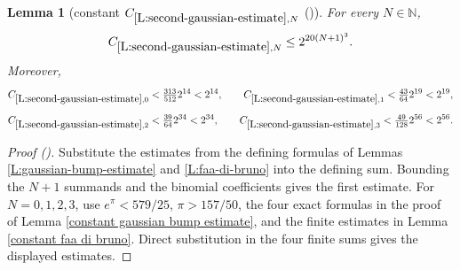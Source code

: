 \documentclass[12pt,reqno]{amsart}
\newcommand{\auto}{{({\tiny\faCar})}}
\theoremstyle{plain}
\newtheorem{lemma}[theorem]{Lemma}
\numberwithin{equation}{section}
\theoremstyle{remark}
\newcommand{\using}[1]{}
\newcommand{\N}{{\mathbb N}}
\newcommand{\ls}[1]{{\color{red}{[L: #1]}}}
\newcommand{\ct}[1]{{\color{magenta}{[C: #1]}}}
\newcommand{\jr}[1]{{\color{orange}{[J: #1]}}}
\begin{document}
\begin{lemma}[constant $C_{\ref{L:second-gaussian-estimate},N}$ \auto]\label{constant second gaussian estimate}\using{L:gaussian-bump-estimate}\using{L:faa-di-bruno}\using{constant gaussian bump estimate}\using{constant faa di bruno}
For every $N\in\N$,
\begin{equation}\label{constant second gaussian estimate bound}
C_{\ref{L:second-gaussian-estimate},N}\le2^{20(N+1)^3}.
\end{equation}
Moreover,
\begin{equation}\label{auto:constant-second-gaussian-estimate-small}
C_{\ref{L:second-gaussian-estimate},0}<\tfrac{313}{512}2^{14}<2^{14},
\qquad
C_{\ref{L:second-gaussian-estimate},1}<\tfrac{43}{64}2^{19}<2^{19},
\end{equation}
\begin{equation}\label{auto:constant-second-gaussian-estimate-small-high}
C_{\ref{L:second-gaussian-estimate},2}<\tfrac{39}{64}2^{34}<2^{34},
\qquad
C_{\ref{L:second-gaussian-estimate},3}<\tfrac{49}{128}2^{56}<2^{56}.
\end{equation}
\end{lemma}
\begin{proof}[Proof \auto]
Substitute the estimates from the defining formulas of Lemmas \ref{L:gaussian-bump-estimate} and \ref{L:faa-di-bruno} into the defining sum. Bounding the $N+1$ summands and the binomial coefficients gives the first estimate. For $N=0,1,2,3$, use $e^\pi<579/25$, $\pi>157/50$, the four exact formulas in the proof of Lemma \ref{constant gaussian bump estimate}, and the finite estimates in Lemma \ref{constant faa di bruno}. Direct substitution in the four finite sums gives the displayed estimates.
\end{proof}


\jr{Need this also for other than the standard bump function $\Phi$ (in reduction section)}
\ls{I changed the assumptions on $\Phi$ (now called $\phi$ since it is no longer the standard bump) to just reflect what is needed. It seems that in applications, $\phi$ is either the standard bump or a window.}
\ct{or maybe neither, as the stadnard bump definition may change
and likewise the window.}
\end{document}
